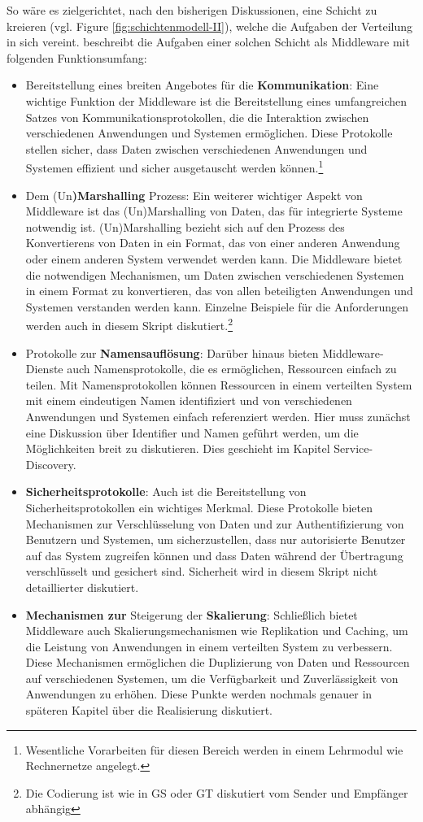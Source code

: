 \documentclass[../vs-script-first-v01.tex]{subfiles}
\begin{document}
So wäre es zielgerichtet, nach den bisherigen Diskussionen, eine Schicht zu kreieren (vgl. Figure \ref{fig:schichtenmodell-II}), welche die Aufgaben der Verteilung in sich vereint.
\cite{tanenbaum2017distributed} beschreibt die Aufgaben einer solchen Schicht als Middleware mit folgenden Funktionsumfang:
\begin{itemize}
\item Bereitstellung eines breiten Angebotes für die \textbf{Kommunikation}: 
Eine wichtige Funktion der Middleware ist die Bereitstellung eines umfangreichen Satzes von Kommunikationsprotokollen, die die Interaktion zwischen verschiedenen Anwendungen und Systemen ermöglichen. Diese Protokolle stellen sicher, dass Daten zwischen verschiedenen Anwendungen und Systemen effizient und sicher ausgetauscht werden können.\footnote{Wesentliche Vorarbeiten für diesen Bereich werden in einem Lehrmodul wie Rechnernetze angelegt.}
\item Dem (Un\textbf{)Marshalling} Prozess: Ein weiterer wichtiger Aspekt von Middleware ist das (Un)Marshalling von Daten, das für integrierte Systeme notwendig ist. (Un)Marshalling bezieht sich auf den Prozess des Konvertierens von Daten in ein Format, das von einer anderen Anwendung oder einem anderen System verwendet werden kann. Die Middleware bietet die notwendigen Mechanismen, um Daten zwischen verschiedenen Systemen in einem Format zu konvertieren, das von allen beteiligten Anwendungen und Systemen verstanden werden kann. Einzelne Beispiele für die Anforderungen werden auch in diesem Skript diskutiert.\footnote{Die Codierung ist wie in GS oder GT diskutiert vom Sender und Empfänger abhängig}
\item Protokolle zur \textbf{Namensauflösung}: Darüber hinaus bieten Middleware-Dienste auch Namensprotokolle, die es ermöglichen, Ressourcen einfach zu teilen. Mit Namensprotokollen können Ressourcen in einem verteilten System mit einem eindeutigen Namen identifiziert und von verschiedenen Anwendungen und Systemen einfach referenziert werden. Hier muss zunächst eine Diskussion über Identifier und Namen geführt werden, um die Möglichkeiten breit zu diskutieren. Dies geschieht im Kapitel Service-Discovery.
\item \textbf{Sicherheitsprotokolle}: Auch ist die Bereitstellung von Sicherheitsprotokollen ein wichtiges Merkmal. Diese Protokolle bieten Mechanismen zur Verschlüsselung von Daten und zur Authentifizierung von Benutzern und Systemen, um sicherzustellen, dass nur autorisierte Benutzer auf das System zugreifen können und dass Daten während der Übertragung verschlüsselt und gesichert sind. Sicherheit wird in diesem Skript nicht detaillierter diskutiert.
\item \textbf{Mechanismen zur} Steigerung der \textbf{Skalierung}: Schließlich bietet Middleware auch Skalierungsmechanismen wie Replikation und Caching, um die Leistung von Anwendungen in einem verteilten System zu verbessern. Diese Mechanismen ermöglichen die Duplizierung von Daten und Ressourcen auf verschiedenen Systemen, um die Verfügbarkeit und Zuverlässigkeit von Anwendungen zu erhöhen. Diese Punkte werden nochmals genauer in späteren Kapitel über die Realisierung diskutiert.
\end{itemize}
\end{document}
